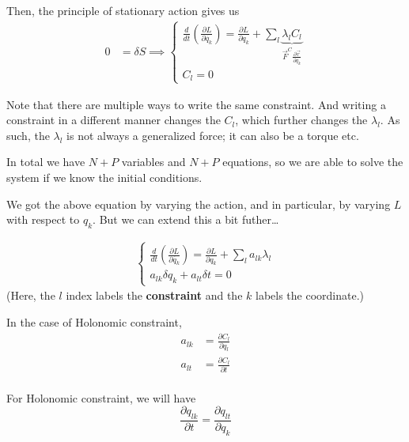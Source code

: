 \documentclass[11pt]{article}
\begin{document}
Then, the principle of stationary action gives us 
\begin{align*}
  0 &= \delta S \implies \begin{cases}
    \frac{d}{dt} \left( \frac{\partial L}{\partial \dot{q_{k}}} \right) = \frac{\partial L}{\partial q_{k}} + \sum_{l} \underbrace{\lambda_l C_l}_{\vec{F}^C \frac{\partial \vec{r}}{\partial q_{k}} } \\
    C_l = 0
  \end{cases}
\end{align*}

\vskip 0.5cm
Note that there are multiple ways to write the same constraint. And writing a constraint in a different manner changes the $C_l$, which further changes the $\lambda_l$. As such, the $\lambda_l$ is not always a generalized force; it can also be a torque etc.

\vskip 0.5cm
In total we have $N+P$ variables and $N+P$ equations, so we are able to solve the system if we know the initial conditions.

\vskip 0.5cm
We got the above equation by varying the action, and in particular, by varying $L$ with respect to $q_k$. But we can extend this a bit futher\dots

\begin{align*}
  \begin{cases}
    \frac{d}{dt} \left( \frac{\partial L}{\partial \dot{q_{k}}}  \right)= \frac{\partial L}{\partial q_{k}} + \sum_{l} a_{lk} \lambda_{l} \\
    a_{lk} \delta q_{k} + a_{lt} \delta t = 0
  \end{cases}
\end{align*}
(Here, the $l$ index labels the \textbf{constraint} and the $k$ labels the coordinate.)

\begin{redbox}
  In the case of Holonomic constraint,
  \begin{align*}
    a_{lk} &= \frac{\partial C_l}{\partial q_{l}} \\
    a_{lt} &= \frac{\partial C_l}{\partial t} \\
  \end{align*}
\end{redbox}

\vskip 0.5cm
For Holonomic constraint, we will have 
\[ \frac{\partial q_{lk}}{\partial t} = \frac{\partial q_{lt}}{\partial q_{k}} \]
\end{document}
